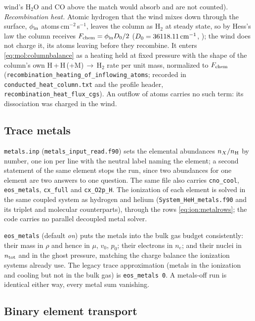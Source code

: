 wind's H$_2$O and CO above the match would absorb and are not counted).
\textit{Recombination heat.} Atomic hydrogen that the wind mixes down through
the surface, $\phi_{\rm in}$ atoms\,cm$^{-2}$\,s$^{-1}$, leaves the column as
H$_2$ at steady state, so by Hess's law the column receives
$F_{\rm chem} = \phi_{\rm in}D_0/2$ ($D_0 = 36118.11\,{\rm cm^{-1}}$,
\citealt{HuberHerzberg1979}); the wind does not charge it, its atoms leaving
before they recombine. It enters \eqref{eq:mol:columnbalance} as a heating
held at fixed pressure with the shape of the column's own
H\,+\,H\,(+M)\,$\to$\,H$_2$ rate per unit mass, normalized to $F_{\rm chem}$
(\texttt{recombination\_heating\_of\_inflowing\_atoms}; recorded in
\texttt{conducted\_heat\_column.txt} and the profile header,
\texttt{recombination\_heat\_flux\_cgs}). An outflow of atoms carries no such
term: its dissociation was charged in the wind.

\subsection{Trace metals}
\label{sec:mol:metals}

\texttt{metals.inp} (\texttt{metals\_input\_read.f90}) sets the elemental
abundances $n_X/n_{\rm H}$ by number, one ion per line with the neutral label
naming the element; a second statement of the same element stops the run,
since two abundances for one element are two answers to one question. The
same file also carries \texttt{cno\_cool}, \texttt{eos\_metals},
\texttt{cx\_full} and \texttt{cx\_O2p\_H}. The ionization of each element is
solved in the same coupled system as hydrogen and helium
(\texttt{System\_HeH\_metals.f90} and its triplet and molecular
counterparts), through the rows \eqref{eq:ion:metalrows}; the code carries no
parallel decoupled metal solver.

\texttt{eos\_metals} (default \emph{on}) puts the metals into the bulk gas
budget consistently: their mass in $\rho$ and hence in $\mu$, $v_0$, $p_0$;
their electrons in $n_e$; and their nuclei in $n_{\rm tot}$ and in the ghost
pressure, matching the charge balance the ionization systems already use.
The legacy trace approximation (metals in the ionization and cooling but not
in the bulk gas) is \texttt{eos\_metals 0}. A metals-off run is identical
either way, every metal sum vanishing.

\subsection{Binary element transport}
\label{sec:mol:diffusion}

